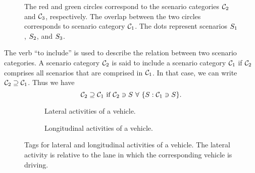 \setlength{\venncircle}{5em}
\begin{figure}[t]
	\centering
	
	\caption{The red and green circles correspond to the scenario categories $\mathcal{C}_{2}$ and $\mathcal{C}_{3}$, respectively. The overlap between the two circles corresponds to scenario category $\mathcal{C}_{1}$. The dots represent scenarios $S_{1}$, $S_{2}$, and $S_{3}$. %
	}
	\label{fig:venn diagram scenario category}
\end{figure}

The verb ``to include'' is used to describe the relation between two scenario categories. A scenario category $\mathcal{C}_{2}$ is said to include a scenario category $\mathcal{C}_{1}$ if $\mathcal{C}_{2}$ comprises all scenarios that are comprised in $\mathcal{C}_{1}$. In that case, we can write $\mathcal{C}_{2} \supseteq \mathcal{C}_{1}$. Thus we have
\begin{equation} \label{eq:scenario category include}
	\mathcal{C}_{2} \supseteq \mathcal{C}_{1} \text{ if } \mathcal{C}_{2} \ni S\,\,\forall\,\, \{S: \mathcal{C}_{1} \ni S\}.
\end{equation}

\begin{figure}[t]
	\centering
	\begin{subfigure}{\linewidth}
		\centering
		\caption{Lateral activities of a vehicle.\vspace{1em}}
		\label{fig:tree vehicle lat act}
	\end{subfigure}
	\begin{subfigure}{\linewidth}
		\centering
		\caption{Longitudinal activities of a vehicle.}
		\label{fig:tree vehicle long act}
	\end{subfigure}
	\caption{Tags for lateral and longitudinal activities of a vehicle. The lateral activity is relative to the lane in which the corresponding vehicle is driving.}
	\label{fig:tree vehicle activities}
\end{figure}


